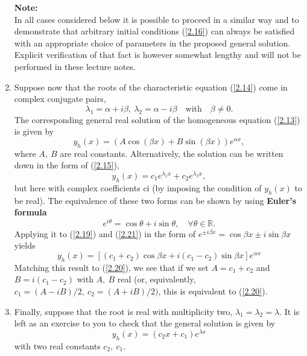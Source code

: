\documentclass[11pt,a4paper]{article}
\begin{document}
\begin{enumerate}
		\textbf{Note:}\\
		In all cases considered below it is possible to proceed in a similar way and to demonstrate that arbitrary initial conditions (\ref{2.16}) can always be satisfied with an appropriate choice of parameters in the proposed general solution. Explicit verification of that fact is however somewhat lengthy and will not be performed in these lecture notes.
		\item Suppose now that the roots of the characteristic equation (\ref{2.14}) come in complex conjugate pairs,
		\begin{equation}\label{2.19}
			\lambda_1 = \alpha + i\beta,\ \lambda_2 = \alpha - i\beta\quad \text{with}\quad \beta \neq 0.
		\end{equation}
		The corresponding general real solution of the homogeneous equation (\ref{2.13}) is given by
		\begin{equation}\label{2.20}
			y_h(x)=(A\cos (\beta x) + B\sin (\beta x))e^{\alpha x},
		\end{equation}
		where $A,\ B$ are real constants. Alternatively, the solution can be written down in the form of (\ref{2.15}),
		\begin{equation}\label{2.21}
			y_h(x) = c_1e^{\lambda_1 x}+c_2e^{\lambda_2 x},
		\end{equation}
		but here with complex coefficients ci (by imposing the condition of $y_h(x)$ to be real). The equivalence of these two forms can be shown by using \textbf{Euler’s formula}
		\begin{equation}\label{2.22}
			e^{i\theta} = \cos\theta + i\sin\theta, \quad \forall \theta \in \mathbb{R}.
		\end{equation}
		Applying it to (\ref{2.19}) and (\ref{2.21}) in the form of $e^{\pm i\beta x} = \cos\beta x \pm i\sin\beta x$ yields
		$$
		y_h(x) = [(c_1+c_2)\cos \beta x + i(c_1-c_2)\sin \beta x]e^{\alpha x}
		$$
		Matching this result to (\ref{2.20}), we see that if we set $A = c_1 + c_2$ and $B = i(c_1 − c_2)$ with $A,\ B$ real (or, equivalently, $c_1 = (A − iB)/2,\ c_2 = (A + iB)/2)$, this is equivalent to (\ref{2.20}).
		\item Finally, suppose that the root is real with multiplicity two, $\lambda_1 = \lambda_2 = \lambda$. It is left as an exercise to you to check that the general solution is given by
		$$
		y_h(x) = (c_2x+c_1)e^{\lambda x}
		$$
		with two real constants $c_2,\ c_1$.
	\end{enumerate}
\end{document}

